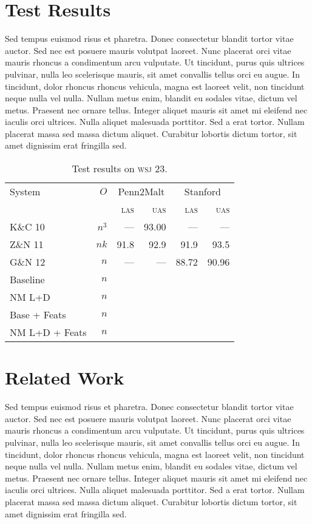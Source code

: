 \documentclass[11pt,letterpaper]{article}
\newcommand{\las}{\textsc{las}\xspace}
\newcommand{\uas}{\textsc{uas}\xspace}
\newcommand{\wsj}{\textsc{wsj}\xspace}
\begin{document}
\section{Test Results}

Sed tempus euismod risus et pharetra. Donec consectetur blandit tortor vitae auctor. Sed nec est posuere mauris volutpat laoreet. Nunc placerat orci vitae mauris rhoncus a condimentum arcu vulputate. Ut tincidunt, purus quis ultrices pulvinar, nulla leo scelerisque mauris, sit amet convallis tellus orci eu augue. In tincidunt, dolor rhoncus rhoncus vehicula, magna est laoreet velit, non tincidunt neque nulla vel nulla. Nullam metus enim, blandit eu sodales vitae, dictum vel metus. Praesent nec ornare tellus. Integer aliquet mauris sit amet mi eleifend nec iaculis orci ultrices. Nulla aliquet malesuada porttitor. Sed a erat tortor. Nullam placerat massa sed massa dictum aliquet. Curabitur lobortis dictum tortor, sit amet dignissim erat fringilla sed.


\begin{table}
    \centering
    \small
    \begin{tabular}{l|r|rr|rr}
        \hline 
System  &   $O$      & \multicolumn{2}{c|}{Penn2Malt} & \multicolumn{2}{c}{Stanford} \\
                           &          & \las  & \uas  & \las & \uas \\
        \hline \hline
K\&C 10  & $n^3$ & ---   & 93.00 & ---  & --- \\
Z\&N 11  & $nk$  & 91.8  & 92.9  & 91.9 & 93.5\\
G\&N 12  & $n$   & ---   & ---   & 88.72 & 90.96 \\
        \hline
Baseline    & $n$ &       &       &       &  \\
NM L+D & $n$ &       &       &       &  \\
\hline
Base + Feats   & $n$ &       &       &       &  \\
NM L+D + Feats & $n$ &       &       &       &  \\
\hline
    \end{tabular}
    \caption{Test results on \wsj 23. 
         \label{tab:feats}}
\end{table}



\section{Related Work}


Sed tempus euismod risus et pharetra. Donec consectetur blandit tortor vitae auctor. Sed nec est posuere mauris volutpat laoreet. Nunc placerat orci vitae mauris rhoncus a condimentum arcu vulputate. Ut tincidunt, purus quis ultrices pulvinar, nulla leo scelerisque mauris, sit amet convallis tellus orci eu augue. In tincidunt, dolor rhoncus rhoncus vehicula, magna est laoreet velit, non tincidunt neque nulla vel nulla. Nullam metus enim, blandit eu sodales vitae, dictum vel metus. Praesent nec ornare tellus. Integer aliquet mauris sit amet mi eleifend nec iaculis orci ultrices. Nulla aliquet malesuada porttitor. Sed a erat tortor. Nullam placerat massa sed massa dictum aliquet. Curabitur lobortis dictum tortor, sit amet dignissim erat fringilla sed.
\end{document}
